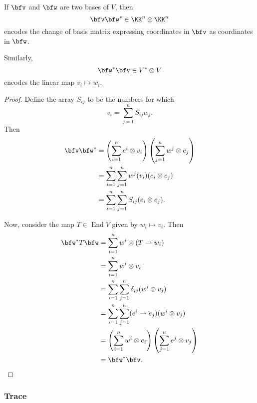 \documentclass{article}
\DeclareMathOperator{\End}{End}
\begin{document}
\begin{proposition}
    If $\bfv$ and $\bfw$ are two bases of $V$, then
    \[
        \bfv\bfw^\ast \in \KK^n \otimes \KK^n
    \]
    encodes the change of basis matrix expressing coordinates in $\bfv$ as coordinates in $\bfw$.

    Similarly,
    \[
        \bfw^\ast\bfv \in V^\ast \otimes V
    \]
    encodes the linear map $v_i \mapsto w_i$.
\end{proposition}
\begin{proof}
    Define the array $S_{ij}$ to be the numbers for which
    \[
        v_i
        =
        \sum_{j=1}^n
        S_{ij}w_j.
    \]
    Then
    \begin{align*}
       \bfv \bfw^\ast
       &=
       \left(
           \sum_{i=1}^n
           e^i \otimes v_i
       \right)
       \left(
           \sum_{j=1}^n
           w^j \otimes e_j
       \right)
       \\
       &=
       \sum_{i=1}^n
       \sum_{j=1}^n
       w^j(v_i)
       (e_i \otimes e_j)
       \\
       &=
       \sum_{i=1}^n
       \sum_{j=1}^n
       S_{ij}
       (e_i \otimes e_j).
    \end{align*}

    Now, consider the map $T \in \End V$ given by $w_i \mapsto v_i$.
    Then
    \begin{align*}
        \bfw^\ast T \bfw
        &=
        \sum_{i=1}^n
        w^i \otimes (T \rightharpoonup w_i)
        \\
        &=
        \sum_{i=1}^n
        w^i \otimes v_i
        \\
        &=
        \sum_{i=1}^n
        \sum_{j=1}^n
        \delta_{ij}
        (w^i \otimes v_j)
        \\
        &=
        \sum_{i=1}^n
        \sum_{j=1}^n
        (e^i \rightharpoonup e_j)
        (w^i \otimes v_j)
        \\
        &=
        \left(
            \sum_{i=1}^n
            w^i \otimes e_i
        \right)
        \left(
            \sum_{j=1}^n
            e^j \otimes v_j
        \right)
        \\
        &=
        \bfw^\ast\bfv.
    \end{align*}
\end{proof}



\subsubsection{Trace}
\end{document}
